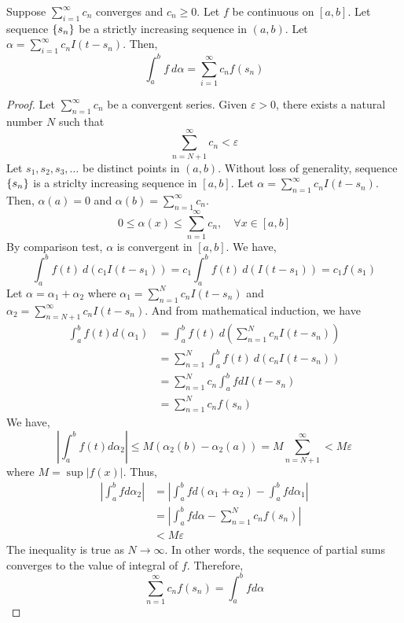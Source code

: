 \begin{theorem}
	Suppose $\displaystyle \sum_{i=1}^\infty c_n$ converges and $c_n \ge 0$.
	Let $f$ be continuous on $[a,b]$.
	Let sequence $\left\{s_n\right\}$ be a strictly increasing sequence in $(a,b)$.
	Let $\displaystyle \alpha = \sum_{i=1}^\infty c_n I(t-s_n)$.
	Then,
	\[ \int_a^b f\ d\alpha = \sum_{i=1}^\infty c_n f(s_n) \]
\end{theorem}
\begin{proof}
	Let $\sum_{n=1}^\infty c_n$ be a convergent series.
	Given $\varepsilon > 0$, there exists a natural number $N$ such that 
	\[ \sum_{n=N+1}^\infty c_n < \varepsilon \]
	Let $s_1,s_2,s_3,\dots$ be distinct points in $(a,b)$.
	Without loss of generality, sequence $\left\{s_n\right\}$ is a striclty increasing sequence in $[a,b]$.
	Let $\alpha = \sum_{n = 1}^\infty c_n I(t-s_n)$.
	Then, $\alpha(a) = 0$ and $\alpha(b) = \sum_{n=1}^\infty c_n$.
	\[ 0 \le \alpha(x) \le \sum_{n=1}^\infty c_n, \quad \forall x \in [a,b] \]
	By comparison test, $\alpha$ is convergent in $[a,b]$.
	We have,
	\[ \int_a^b f(t)\ d(c_1 I(t-s_1)) = c_1 \int_a^b f(t)\ d(I(t-s_1)) =  c_1 f(s_1) \]
	Let $\alpha = \alpha_1 + \alpha_2$ where $\displaystyle \alpha_1 = \sum_{n=1}^N c_n I(t-s_n)$ and $\displaystyle\alpha_2 = \sum_{n=N+1}^\infty c_n I(t-s_n)$.
	And from mathematical induction, we have
	\begin{align*}
	\int_a^b f(t) d(\alpha_1) 
		& = \int_a^b f(t)\ d\left( \sum_{n=1}^N c_n I(t-s_n) \right)\\
		& = \sum_{n=1}^N \int_a^b f(t)\ d(c_nI(t-s_n)) \\
		& = \sum_{n=1}^N c_n \int_a^b f dI(t-s_n) \\
		& = \sum_{n=1}^N c_n f(s_n) 
	\end{align*}
	We have,
	\[ \left| \int_a^b f(t) d\alpha_2 \right| \le M (\alpha_2(b) - \alpha_2(a)) = M \sum_{n=N+1}^\infty < M\varepsilon \]
	where $M = \sup |f(x)|$.
	Thus,
	\begin{align*}
	\left| \int_a^b fd\alpha_2 \right| 
		& = \left| \int_a^b f d(\alpha_1+\alpha_2) - \int_a^b fd\alpha_1 \right| \\
		& = \left| \int_a^b fd\alpha - \sum_{n=1}^N c_n f(s_n) \right| \\
		& < M\varepsilon 
	\end{align*}
	The inequality is true as $N \to \infty$. 
	In other words, the sequence of partial sums converges to the value of integral of $f$.
	Therefore,
	\[ \sum_{n=1}^\infty c_n f(s_n) = \int_a^b f d\alpha \]
\end{proof}

